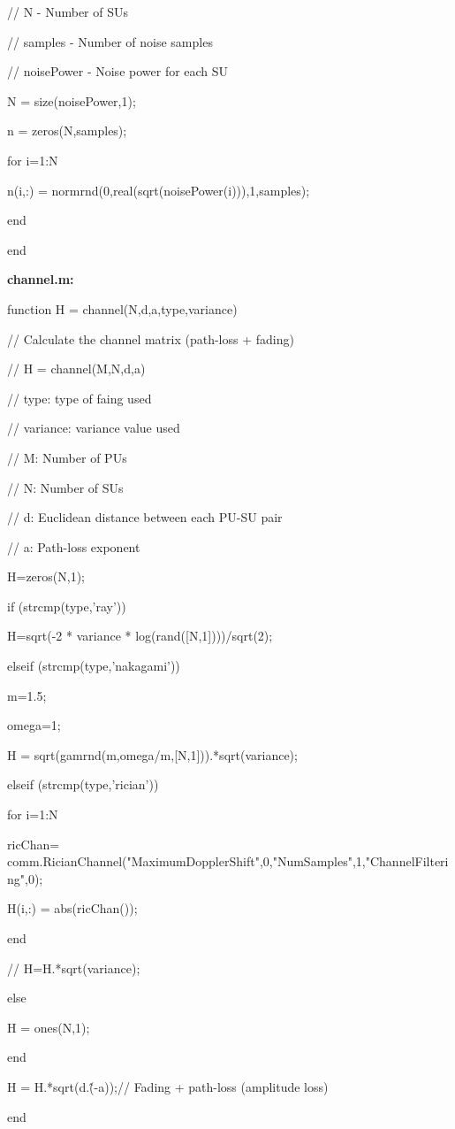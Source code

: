 // N - Number of SUs

// samples - Number of noise samples 

// noisePower - Noise power for each SU

N = size(noisePower,1);

n = zeros(N,samples);

for i=1:N

    n(i,:) = normrnd(0,real(sqrt(noisePower(i))),1,samples);

end

end


\textbf{channel.m:}

function H = channel(N,d,a,type,variance)

// Calculate the channel matrix (path-loss + fading)

// H = channel(M,N,d,a)

// type: type of faing used

// variance: variance value used

// M: Number of PUs

// N: Number of SUs

// d: Euclidean distance between each PU-SU pair

// a: Path-loss exponent

H=zeros(N,1);

if (strcmp(type,'ray'))

    H=sqrt(-2 * variance * log(rand([N,1])))/sqrt(2);

elseif (strcmp(type,'nakagami'))

    m=1.5;

    omega=1;

    H = sqrt(gamrnd(m,omega/m,[N,1])).*sqrt(variance);

elseif (strcmp(type,'rician'))

    for i=1:N

        ricChan= comm.RicianChannel("MaximumDopplerShift",0,"NumSamples",1,"ChannelFiltering",0);

        H(i,:) = abs(ricChan());

    end

    // H=H.*sqrt(variance);

else

    H = ones(N,1);

end

H = H.*sqrt(d.\^(-a));// Fading + path-loss (amplitude loss)

end
